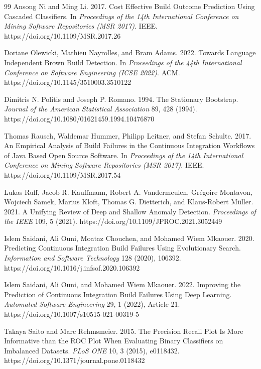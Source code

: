 \documentclass[sigconf,review,anonymous,nonacm]{acmart}
\begin{document}
\begin{thebibliography}{99}
Ansong Ni and Ming Li. 2017.
Cost Effective Build Outcome Prediction Using Cascaded Classifiers.
In \textit{Proceedings of the 14th International Conference on Mining Software Repositories (MSR 2017)}. IEEE. https://doi.org/10.1109/MSR.2017.26

Doriane Olewicki, Mathieu Nayrolles, and Bram Adams. 2022.
Towards Language Independent Brown Build Detection.
In \textit{Proceedings of the 44th International Conference on Software Engineering (ICSE 2022)}. ACM. https://doi.org/10.1145/3510003.3510122

Dimitris N. Politis and Joseph P. Romano. 1994.
The Stationary Bootstrap.
\textit{Journal of the American Statistical Association} 89, 428 (1994). https://doi.org/10.1080/01621459.1994.10476870

Thomas Rausch, Waldemar Hummer, Philipp Leitner, and Stefan Schulte. 2017.
An Empirical Analysis of Build Failures in the Continuous Integration Workflows of Java Based Open Source Software.
In \textit{Proceedings of the 14th International Conference on Mining Software Repositories (MSR 2017)}. IEEE. https://doi.org/10.1109/MSR.2017.54

Lukas Ruff, Jacob R. Kauffmann, Robert A. Vandermeulen, Gr\'{e}goire Montavon, Wojciech Samek, Marius Kloft, Thomas G. Dietterich, and Klaus-Robert M\"{u}ller. 2021.
A Unifying Review of Deep and Shallow Anomaly Detection.
\textit{Proceedings of the IEEE} 109, 5 (2021). https://doi.org/10.1109/JPROC.2021.3052449

Islem Saidani, Ali Ouni, Moataz Chouchen, and Mohamed Wiem Mkaouer. 2020.
Predicting Continuous Integration Build Failures Using Evolutionary Search.
\textit{Information and Software Technology} 128 (2020), 106392. https://doi.org/10.1016/j.infsof.2020.106392

Islem Saidani, Ali Ouni, and Mohamed Wiem Mkaouer. 2022.
Improving the Prediction of Continuous Integration Build Failures Using Deep Learning.
\textit{Automated Software Engineering} 29, 1 (2022), Article 21. https://doi.org/10.1007/s10515-021-00319-5

Takaya Saito and Marc Rehmsmeier. 2015.
The Precision Recall Plot Is More Informative than the ROC Plot When Evaluating Binary Classifiers on Imbalanced Datasets.
\textit{PLoS ONE} 10, 3 (2015), e0118432. https://doi.org/10.1371/journal.pone.0118432


\end{thebibliography}
\end{document}
